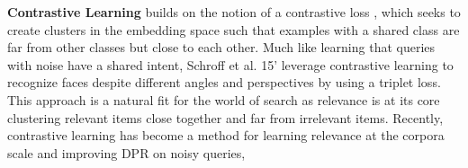 \textbf{Contrastive Learning} builds on the notion of a contrastive loss \cite{Chopra2005LearningAS}, which seeks to create clusters in the embedding space such that examples with a shared class are far from other classes but close to each other. Much like learning that queries with noise have a shared intent, Schroff et al. 15' leverage contrastive learning to recognize faces despite different angles and perspectives \cite{Schroff2015FaceNetAU} by using a triplet loss. This approach is a natural fit for the world of search as relevance is at its core clustering relevant items close together and far from irrelevant items. Recently, contrastive learning has become a method for learning relevance at the corpora scale \cite{Xiong2021ApproximateNN} and improving DPR on noisy queries, \cite{Sidiropoulos2022AnalysingTR} \cite{Chen2022TowardsRD}